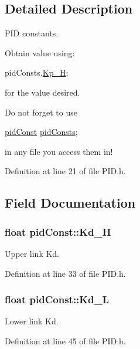 \subsection{Detailed Description}
P\-I\-D constants. 

Obtain value using\-:
\begin{DoxyCode}
pidConsts.\hyperlink{structpid_const_ae2c7d62f4fd919c89233a39e1a84b2db}{Kp\_H}; 
\end{DoxyCode}
 for the value desired.

Do not forget to use
\begin{DoxyCode}
\hyperlink{structpid_const}{pidConst} \hyperlink{_p_i_d_8h_a4d2fc78b5924045bcc0e20fc95e18d97}{pidConsts}; 
\end{DoxyCode}
 in any file you access them in! 

Definition at line 21 of file P\-I\-D.\-h.



\subsection{Field Documentation}
\hypertarget{structpid_const_a239f5a849b57db2f52fe4e44aa979e2f}{
\subsubsection[{Kd\-\_\-\-H}]{\setlength{\rightskip}{0pt plus 5cm}float pid\-Const\-::\-Kd\-\_\-\-H}}\label{structpid_const_a239f5a849b57db2f52fe4e44aa979e2f}


Upper link Kd. 



Definition at line 33 of file P\-I\-D.\-h.

\hypertarget{structpid_const_ab1d5ff1148dc4f1b174757fe513bc368}{
\subsubsection[{Kd\-\_\-\-L}]{\setlength{\rightskip}{0pt plus 5cm}float pid\-Const\-::\-Kd\-\_\-\-L}}\label{structpid_const_ab1d5ff1148dc4f1b174757fe513bc368}


Lower link Kd. 



Definition at line 45 of file P\-I\-D.\-h.

